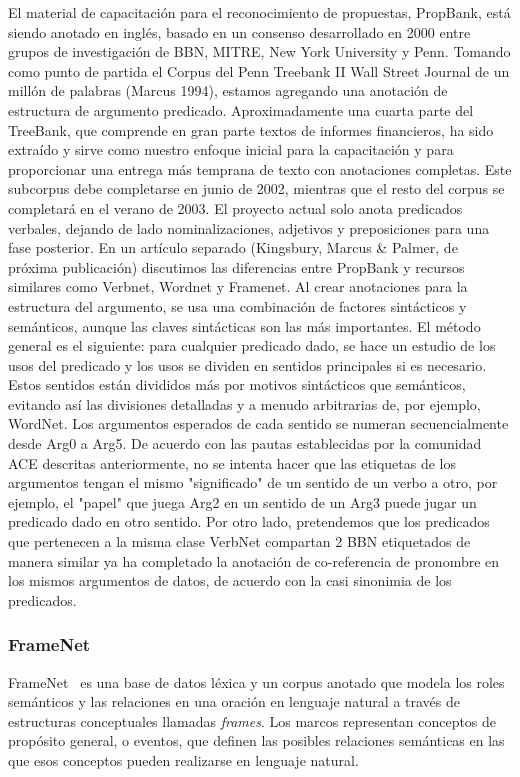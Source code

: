 El material de capacitación para el reconocimiento de propuestas, PropBank, está siendo anotado en inglés, basado en un consenso desarrollado en 2000 entre grupos de investigación de BBN, MITRE, New York University y Penn. Tomando como punto de partida el Corpus del Penn Treebank II Wall Street Journal de un millón de palabras (Marcus 1994), estamos agregando una anotación de estructura de argumento predicado. Aproximadamente una cuarta parte del TreeBank, que comprende en gran parte textos de informes financieros, ha sido extraído y sirve como nuestro enfoque inicial para la capacitación y para proporcionar una entrega más temprana de texto con anotaciones completas. Este subcorpus debe completarse en junio de 2002, mientras que el resto del corpus se completará en el verano de 2003. El proyecto actual solo anota predicados verbales, dejando de lado nominalizaciones, adjetivos y preposiciones para una fase posterior. En un artículo separado (Kingsbury, Marcus \& Palmer, de próxima publicación) discutimos las diferencias entre PropBank y recursos similares como Verbnet, Wordnet y Framenet. Al crear anotaciones para la estructura del argumento, se usa una combinación de factores sintácticos y semánticos, aunque las claves sintácticas son las más importantes. El método general es el siguiente: para cualquier predicado dado, se hace un estudio de los usos del predicado y los usos se dividen en sentidos principales si es necesario. Estos sentidos están divididos más por motivos sintácticos que semánticos, evitando así las divisiones detalladas y a menudo arbitrarias de, por ejemplo, WordNet. Los argumentos esperados de cada sentido se numeran secuencialmente desde Arg0 a Arg5. De acuerdo con las pautas establecidas por la comunidad ACE descritas anteriormente, no se intenta hacer que las etiquetas de los argumentos tengan el mismo "significado" de un sentido de un verbo a otro, por ejemplo, el "papel" que juega Arg2 en un sentido de un Arg3 puede jugar un predicado dado en otro sentido. Por otro lado, pretendemos que los predicados que pertenecen a la misma clase VerbNet compartan 2 BBN etiquetados de manera similar ya ha completado la anotación de co-referencia de pronombre en los mismos argumentos de datos, de acuerdo con la casi sinonimia de los predicados.

\subsubsection*{FrameNet}

FrameNet~\cite{framenet} es una base de datos léxica y un corpus anotado que modela los roles semánticos y las relaciones en una oración en lenguaje natural a través de estructuras conceptuales llamadas \textit{frames}. Los marcos representan conceptos de propósito general, o eventos, que definen las posibles relaciones semánticas en las que esos conceptos pueden realizarse en lenguaje natural.

